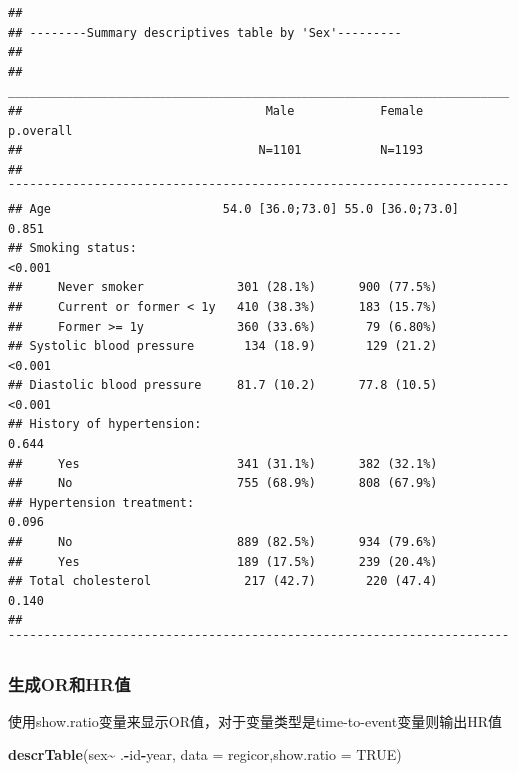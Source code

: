 \documentclass[
]{article}
\newenvironment{Shaded}{\begin{snugshade}}{\end{snugshade}}
\newcommand{\AttributeTok}[1]{\textcolor[rgb]{0.13,0.29,0.53}{#1}}
\newcommand{\ConstantTok}[1]{\textcolor[rgb]{0.56,0.35,0.01}{#1}}
\newcommand{\FunctionTok}[1]{\textcolor[rgb]{0.13,0.29,0.53}{\textbf{#1}}}
\newcommand{\NormalTok}[1]{#1}
\newcommand{\SpecialCharTok}[1]{\textcolor[rgb]{0.81,0.36,0.00}{\textbf{#1}}}
\newcommand{\StringTok}[1]{\textcolor[rgb]{0.31,0.60,0.02}{#1}}
\begin{document}
\begin{verbatim}
## 
## --------Summary descriptives table by 'Sex'---------
## 
## ______________________________________________________________________ 
##                                  Male            Female      p.overall 
##                                 N=1101           N=1193                
## ¯¯¯¯¯¯¯¯¯¯¯¯¯¯¯¯¯¯¯¯¯¯¯¯¯¯¯¯¯¯¯¯¯¯¯¯¯¯¯¯¯¯¯¯¯¯¯¯¯¯¯¯¯¯¯¯¯¯¯¯¯¯¯¯¯¯¯¯¯¯ 
## Age                        54.0 [36.0;73.0] 55.0 [36.0;73.0]   0.851   
## Smoking status:                                               <0.001   
##     Never smoker             301 (28.1%)      900 (77.5%)              
##     Current or former < 1y   410 (38.3%)      183 (15.7%)              
##     Former >= 1y             360 (33.6%)       79 (6.80%)              
## Systolic blood pressure       134 (18.9)       129 (21.2)     <0.001   
## Diastolic blood pressure     81.7 (10.2)      77.8 (10.5)     <0.001   
## History of hypertension:                                       0.644   
##     Yes                      341 (31.1%)      382 (32.1%)              
##     No                       755 (68.9%)      808 (67.9%)              
## Hypertension treatment:                                        0.096   
##     No                       889 (82.5%)      934 (79.6%)              
##     Yes                      189 (17.5%)      239 (20.4%)              
## Total cholesterol             217 (42.7)       220 (47.4)      0.140   
## ¯¯¯¯¯¯¯¯¯¯¯¯¯¯¯¯¯¯¯¯¯¯¯¯¯¯¯¯¯¯¯¯¯¯¯¯¯¯¯¯¯¯¯¯¯¯¯¯¯¯¯¯¯¯¯¯¯¯¯¯¯¯¯¯¯¯¯¯¯¯
\end{verbatim}

\subsubsection{\texorpdfstring{\textbf{生成OR和HR值}}{生成OR和HR值}}\label{ux751fux6210orux548chrux503c}

使用show.ratio变量来显示OR值，对于变量类型是time-to-event变量则输出HR值

\begin{Shaded}
\begin{Highlighting}[]
 \FunctionTok{descrTable}\NormalTok{(}\StringTok{\textasciigrave{}}\AttributeTok{sex}\StringTok{\textasciigrave{}}\SpecialCharTok{\textasciitilde{}}\NormalTok{ .}\SpecialCharTok{{-}}\NormalTok{id}\SpecialCharTok{{-}}\NormalTok{year, }\AttributeTok{data =}\NormalTok{ regicor,}\AttributeTok{show.ratio =} \ConstantTok{TRUE}\NormalTok{)}
\end{Highlighting}
\end{Shaded}
\end{document}
